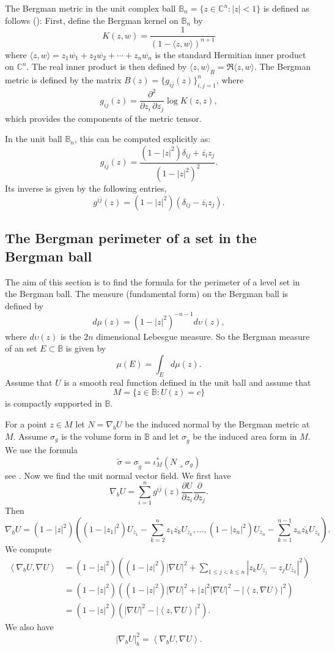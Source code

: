 \documentclass[11pt]{amsart}
\numberwithin{equation}{section}
\begin{document}
The Bergman metric in the unit complex ball \( \mathbb{B}_n = \{ z \in \mathbb{C}^n : | z | < 1 \} \) is defined as follows (\cite{rudin}):
 First, define the Bergman kernel on \( \mathbb{B}_n \) by
   \[
   K(z, w) =  \frac{1}{(1 - \langle z, w \rangle)^{n+1}}
   \]
   where \( \langle z, w \rangle = z_1 \overline{w_1} + z_2 \overline{w_2} + \cdots + z_n \overline{w_n} \) is the standard Hermitian inner product on \( \mathbb{C}^n \). The real inner product is then defined  by \( \langle z, w \rangle_R =\Re  \langle z, w \rangle\).
The Bergman metric is defined by the matrix \( B(z) = \{ g_{i\bar{j}}(z) \}_{i,j=1}^n \), where
\[
g_{i \bar{j}}(z) = \frac{\partial^2}{\partial z_i \, \partial \overline{z_j}} \log K(z, z),
\]
which provides the components of the metric tensor.

In the unit ball \( \mathbb{B}_n \), this can be computed explicitly as:
   \[
   g_{i \bar{j}}(z) = \frac{(1 - | z |^2) \delta_{ij} + \overline{z_i} z_j}{(1 - | z |^2)^2}.
   \]
Its inverse is given by the following entries,
   \[
   g^{i \bar{j}}(z) = (1 - | z |^2) (\delta_{ij} - \overline{z_i} z_j).
   \]
\subsection{The Bergman perimeter of a set in the Bergman ball} The aim of this section is to find the formula for the perimeter of a level set in the Bergman ball.
The measure (fundamental form) on the Bergman ball is defined by $$d\mu(z) = (1-|z|^2)^{-n-1} d\upsilon(z),$$ where $d\upsilon(z)$ is the $2n$ dimensional Lebesgue measure. So the Bergman measure of an set $E\subset \mathbb{B}$ is given by $$\mu(E) = \int_{E} d\mu (z).$$
   Assume that $U$ is a smooth real function defined in the unit ball and assume that $$M=\{z\in\mathbb{B}: U(z)=c\}$$ is compactly supported in $\mathbb{B}$.

  For a point $z\in M$ let $N=\nabla_b U$ be the induced normal by the Bergman metric at $M$. Assume $\sigma_g$ is the volume form in $\mathbb{B}$ and let $\sigma_{\tilde g}$ be the induced area form in $M$. We use the formula
\begin{equation}\label{tilde}
\tilde \sigma=\sigma_{\tilde g}=\iota^\ast_M(N\lrcorner \sigma_g)\end{equation} see \cite[Proposition~15.32]{lee}.
  Now we find the unit normal vector field. We first have  $$ \nabla_b U= \sum_{i=1}^n g^{i\bar{j}}(z) \frac{\partial U}{\partial z_i}\frac{\partial}{\partial z_j}.$$
Then
$$\nabla_b U = (1-|z|^2)((1-|z_1|^2)U_{\overline{z}_1}-\sum_{k=2}^n z_1\overline{z_k}U_{\overline{z}_k},\dots,
(1-|z_n|^2)U_{\overline{z}_n}-\sum_{k=1}^{n-1} z_n\overline{z_k}U_{\overline{z}_k}).$$
   We compute
\[\begin{split}\left<\nabla_b U, \nabla U\right> &= (1-|z|^2)\left((1-|z|^2) |\nabla U|^2 + \sum_{1\le j<k\le n}|z_k U_{\bar{z}_j}-z_j U_{\bar z_k}|^2\right)
\\&=(1-|z|^2)\left( (1-|z|^2) |\nabla U|^2 + |z|^2 |\nabla U|^2 - |\left< z,\nabla U\right>|^2\right)
\\&=  (1-|z|^2)(|\nabla U|^2-|\left< z,\nabla U\right>|^2). \end{split}\]
We also have $$|\nabla_b U|_b^2 = \left<\nabla_b U, \nabla U\right>.$$
\end{document}
